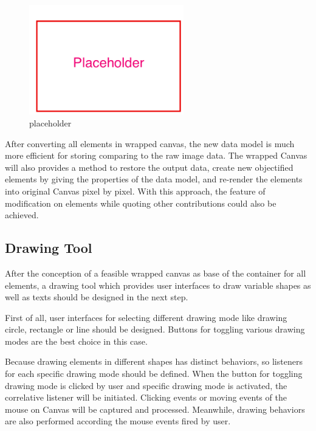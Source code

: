 \begin{figure}[!htbp]
  \centering
    \includegraphics[width=0.6\textwidth]{Figures/placeholder.png}
  \caption{placeholder}
  \label{fig:wrapped-canvas-data}
\end{figure}

After converting all elements in wrapped canvas, the new data model is much more efficient for storing comparing to the raw image data. The wrapped Canvas will also provides a method to restore the output data, create new objectified elements by giving the properties of the data model, and re-render the elements into original Canvas pixel by pixel. With this approach, the feature of modification on elements while quoting other contributions could also be achieved. 

\subsection{Drawing Tool}

After the conception of a feasible wrapped canvas as base of the container for all elements, a drawing tool which provides user interfaces to draw variable shapes as well as texts should be designed in the next step. 

First of all, user interfaces for selecting different drawing mode like drawing circle, rectangle or line should be designed. Buttons for toggling various drawing modes are the best choice in this case.

Because drawing elements in different shapes has distinct behaviors, so listeners for each specific drawing mode should be defined. When the button for toggling drawing mode is clicked by user and specific drawing mode is activated, the correlative listener will be initiated. Clicking events or moving events of the mouse on Canvas will be captured and processed. Meanwhile, drawing behaviors are also performed according the mouse events fired by user.

